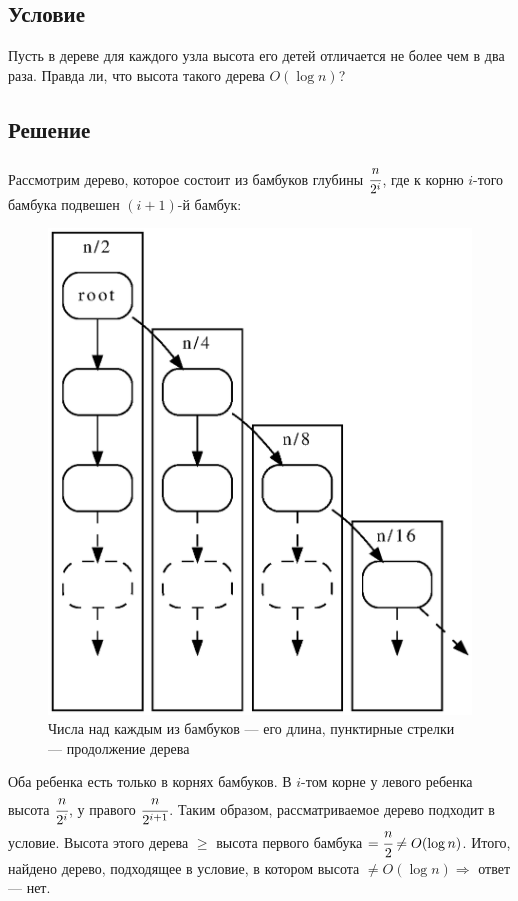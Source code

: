 \documentclass[12pt, a4paper]{article}
\begin{document}
\subsection*{Условие}

Пусть в дереве для каждого узла высота его детей отличается не более чем в два раза. Правда
ли, что высота такого дерева $O(\log n)$?

\subsection*{Решение}

Рассмотрим дерево, которое состоит из бамбуков глубины $\cfrac{n}{2^i}$, где к корню $i$-того бамбука подвешен $(i+1)$-й бамбук:

\begin{figure}[h]
\includegraphics[scale=0.7]{bamboos.dot.eps}
\centering
\caption{Числа над каждым из бамбуков --- его длина, пунктирные стрелки --- продолжение дерева}
\end{figure}

Оба ребенка есть только в корнях бамбуков. В $i$-том корне у левого ребенка высота $\cfrac{n}{2^i}$, у правого $\cfrac{n}{2^{i+1}}$. Таким образом, рассматриваемое дерево подходит в условие. Высота этого дерева $\geq$ высота первого бамбука $=\cfrac{n}{2}\not=O(\log n)$. Итого, найдено дерево, подходящее в условие, в котором высота $\not=O(\log n) \Rightarrow$ ответ --- нет.
\end{document}
